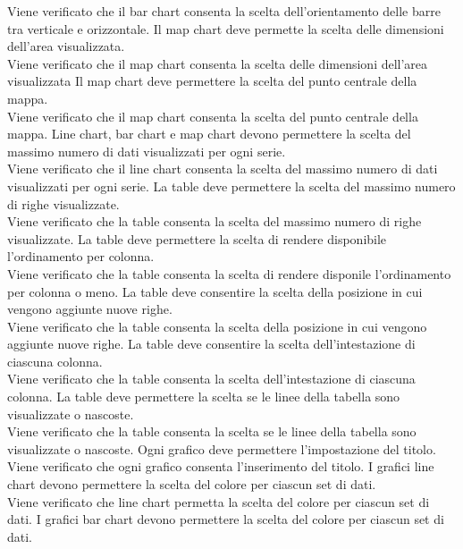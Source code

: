 Viene verificato che il bar chart consenta la scelta dell'orientamento delle barre tra verticale e orizzontale.
 Il map chart deve permette la scelta delle dimensioni dell'area visualizzata.\\
Viene verificato che il map chart consenta la scelta delle dimensioni dell'area visualizzata
	Il map chart deve permettere la scelta del punto centrale della mappa.\\
Viene verificato che il map chart consenta la scelta del punto centrale della mappa.
	Line chart, bar chart e map chart devono permettere la scelta del massimo numero di dati visualizzati per ogni serie.\\
Viene verificato che il line chart consenta la scelta del massimo numero di dati visualizzati per ogni serie.
	La table deve permettere la scelta del massimo numero di righe visualizzate.\\
Viene verificato che la table consenta la scelta del massimo numero di righe visualizzate.
	La table deve permettere la scelta di rendere disponibile l'ordinamento per colonna.\\
Viene verificato che la table consenta la scelta di rendere disponile l'ordinamento per colonna o meno.
	La table deve consentire la scelta della posizione in cui vengono aggiunte nuove righe.\\
Viene verificato che la table consenta la scelta della posizione in cui vengono aggiunte nuove righe.
 La table deve consentire la scelta dell'intestazione di ciascuna colonna.\\
Viene verificato che la table consenta la scelta dell'intestazione di ciascuna colonna.
	La table deve permettere la scelta se le linee della tabella sono visualizzate o nascoste.\\
Viene verificato che la table consenta la scelta se le linee della tabella sono visualizzate o nascoste.
	Ogni grafico deve permettere l'impostazione del titolo.\\
Viene verificato che ogni grafico consenta l'inserimento del titolo.
	I grafici line chart devono permettere la scelta del colore per ciascun set di dati.\\
Viene verificato che line chart permetta la scelta del colore per ciascun set di dati.
	 I grafici bar chart devono permettere la scelta del colore per ciascun set di dati.\\
